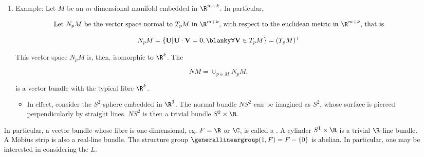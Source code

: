 \begin{enumerate}
    \item Example: Let $M$ be an $m$-dimensional manifold embedded in $\R^{m+k}$.
    In particular, 

    \[  
        \begin{array}{cc}
             \textnormal{Let $N_p M$ be the vector space normal to $T_p M$ in  $\R^{m+k}$, with respect to the euclidean metric in $\R^{m+k}$, that is} \\
             \\
             N_p M = \{{\bf U} | {{\bf U} \cdot {\bf V}} = 0, \blanky \forall {\bf V} \in T_p M \} = (T_p M)^\bot
        \end{array}
    \]

    This vector space $N_p M$ is, then, isomorphic to $\R^k$. The 

    \[
        NM = \cup_{p \in M} N_p M,
    \]    

    is a vector bundle with the typical fibre $\R^k$. \\ 

    \begin{itemize}
        \item In effect, consider the $S^2$-sphere embedded in $\R^3$. 
        The normal bundle $NS^2$ can be imagined as $S^2$, whose surface is pierced perpendicularly by straight lines.
        $NS^2$ is then a trivial bundle $S^2 \times \R$. \\
    \end{itemize}
\end{enumerate}

In particular, a vector bundle whose fibre is one-dimensional, eg. $F = \R$ or $\C$, is called a .
A cylinder $S^1 \times \R$ is a trivial $\R$-line bundle. 
A M\"obius strip is also a real-line bundle.
The structure group $\generallineargroup(1, F) = F - \{0\}$ is abelian. 
In particular, one may be interested in considering the  $L$. 

